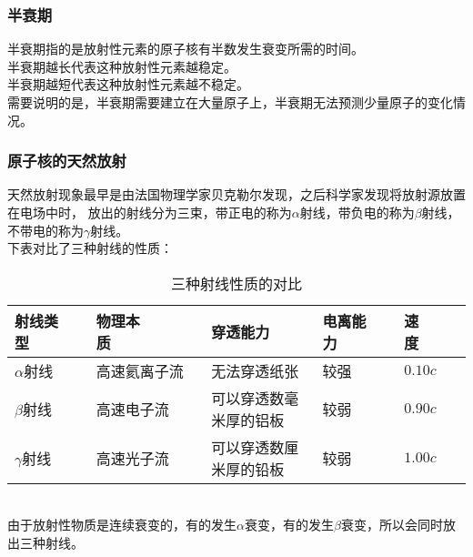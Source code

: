 \documentclass[UTF8]{ctexart}
\begin{document}
\newpage

\subsubsection{半衰期}
    半衰期指的是放射性元素的原子核有半数发生衰变所需的时间。\\[3mm]
    半衰期越长代表这种放射性元素越稳定。\\[3mm]
    半衰期越短代表这种放射性元素越不稳定。\\[3mm]
    需要说明的是，半衰期需要建立在大量原子上，半衰期无法预测少量原子的变化情况。\\

\subsubsection{原子核的天然放射}
    天然放射现象最早是由法国物理学家贝克勒尔发现，之后科学家发现将放射源放置在电场中时，
    放出的射线分为三束，带正电的称为$\alpha$射线，带负电的称为$\beta$射线，不带电的称为$\gamma$射线。\\[3mm]
    下表对比了三种射线的性质：
    \begin{table}[h!]
        \begin{center}
            \begin{tabular}{l|l|l|l|l}
                \hline
                射线类型~~~~&物理本质~~~~~~~~&穿透能力~~~~&电离能力~~~~&速度~~~~\\ \hline
                $\alpha$射线&高速氦离子流&无法穿透纸张&较强&$0.10c$\\ \hline
                $\beta$射线&高速电子流&可以穿透数毫米厚的铝板&较弱&$0.90c$\\ \hline
                $\gamma$射线&高速光子流&可以穿透数厘米厚的铅板&较弱&$1.00c$\\ \hline
            \end{tabular}
            \caption{三种射线性质的对比}
        \end{center}
    \end{table}\\
    由于放射性物质是连续衰变的，有的发生$\alpha$衰变，有的发生$\beta$衰变，所以会同时放出三种射线。\\
    
\end{document}

